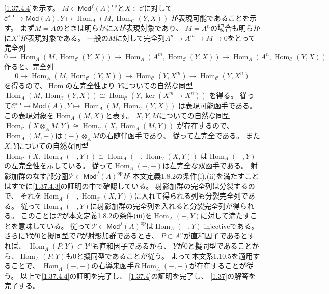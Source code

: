 \documentclass[uplatex,dvipdfmx]{jsarticle}
\makeatletter
\theoremstyle{definition}
\renewenvironment{proof}[1][\proofname]{
  \pushQED{\qed}%
  \normalfont \topsep6\p@\@plus6\p@\relax
  \trivlist
  \item[\hskip\labelsep
    #1\@addpunct{\textbf{.}}]\ignorespaces
}{%
  \popQED\endtrivlist\@endpefalse
}
\providecommand{\proofname}{証明}
\DeclareMathOperator{\Hom}{\mathrm{Hom}}
\newcommand{\op}{\mathrm{op}}
\newcommand{\Mod}{\mathsf{Mod}}
\newcommand\mcC{\mathcal{C}}
\newcommand\mcP{\mathcal{P}}
\makeatother
\begin{document}
\begin{proof}
  \ref{1.37.4.4}を示す。
  \(M\in \Mod^f(A)^{\op}\)と\(X\in \mcC\)に対して
  \(\mcC^{\op}\to \Mod(A), Y\mapsto \Hom_A(M,\Hom_{\mcC}(Y,X))\)
  が表現可能であることを示す。
  まず\(M=A\)のときは明らかに\(X\)が表現対象であり、
  \(M=A^n\)の場合も明らかに\(X^n\)が表現対象である。
  一般の\(M\)に対して完全列\(A^n\to A^m\to M\to 0\)をとって
  完全列
  \[
  0\to \Hom_A(M,\Hom_{\mcC}(Y,X))\to \Hom_A(A^m,\Hom_{\mcC}(Y,X))\to
  \Hom_A(A^n,\Hom_{\mcC}(Y,X))
  \]
  作ると、完全列
  \[
  0\to \Hom_A(M,\Hom_{\mcC}(Y,X)) \to \Hom_{\mcC}(Y,X^m)\to \Hom_{\mcC}(Y,X^n)
  \]
  を得るので、\(\Hom\)の左完全性より
  \(Y\)についての自然な同型
  \(\Hom_A(M,\Hom_{\mcC}(Y,X))\cong \Hom_{\mcC}(Y,\ker(X^m\to X^n))\)
  を得る。
  従って\(\mcC^{\op}\to \Mod(A), Y\mapsto \Hom_A(M,\Hom_{\mcC}(Y,X))\)
  は表現可能函手である。
  この表現対象を\(\Hom_A(M,X)\)と表す。
  \(X,Y,M\)についての自然な同型
  \(\Hom_{\mcC}(X\otimes_AM,Y) \cong \Hom_{\mcC}(X,\Hom_A(M,Y))\)
  が存在するので、
  \(\Hom_A(M,-)\)は\((-)\otimes_AM\)の右随伴函手であり、
  従って左完全である。
  また\(X,Y\)についての自然な同型
  \(\Hom_{\mcC}(X,\Hom_A(-,Y))\cong \Hom_A(-,\Hom_{\mcC}(X,Y))\)
  は\(\Hom_A(-,Y)\)の左完全性を示している。
  従って\(\Hom_A(-,-)\)は左完全な双函手である。
  射影加群のなす部分圏\(\mcP\subset \Mod^f(A)^{\op}\)が
  本文定義1.8.2の条件(i),(ii)を満たすことはすでに\ref{1.37.4.3}の証明の中で確認している。
  射影加群の完全列は分裂するので、
  それを\(\Hom_A(-,\Hom_{\mcC}(X,Y))\)に入れて得られる列も分裂完全列である。
  従って\(\Hom_A(-,Y)\)に射影加群の完全列を入れると分裂完全列が得られる。
  このことは\(\mcP\)が本文定義1.8.2の条件(iii)を\(\Hom_A(-,Y)\)に対して満たすことを意味している。
  従って\(\mcP\subset \Mod^f(A)^{\op}\)は\(\Hom_A(-,Y)\)-injectiveである。
  さらに\(Y\)が\(0\)と擬同型で\(P\)が射影加群であるとき、
  \(P\subset A^n\)が直和因子であるとすれば、
  \(\Hom_A(P,Y)\subset Y^n\)も直和因子であるから、
  \(Y\)が\(0\)と擬同型であることから、\(\Hom_A(P,Y)\)も\(0\)と擬同型であることが従う。
  よって本文系1.10.5を適用することで、
  \(\Hom_A(-,-)\)の右導来函手\(R\Hom_A(-,-)\)が存在することが従う。
  以上で\ref{1.37.4.4}の証明を完了し、
  \ref{1.37.4}の証明を完了し、
  \autoref{1.37}の解答を完了する。
\end{proof}
\end{document}
